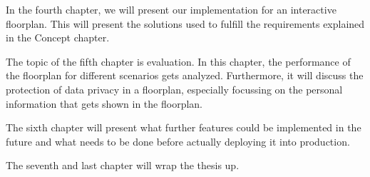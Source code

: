 In the fourth chapter, we will present our implementation for an interactive floorplan. This will present the solutions used to fulfill the requirements explained in the Concept chapter.

The topic of the fifth chapter is evaluation. In this chapter, the performance of the floorplan for different scenarios gets analyzed. Furthermore, it will discuss the protection of data privacy in a floorplan, especially focussing on the personal information that gets shown in the floorplan.

The sixth chapter will present what further features could be implemented in the future and what needs to be done before actually deploying it into production. 

The seventh and last chapter will wrap the thesis up.

\clearpage